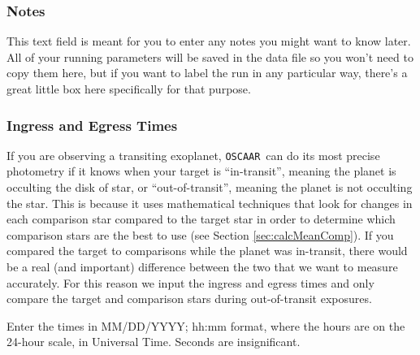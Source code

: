 \documentclass[a4paper]{article}
\newcommand{\code}[1]{\texttt{#1}}
\newcommand{\oscaar}{\code{OSCAAR}~}
\begin{document}
\subsubsection{Notes}
This text field is meant for you to enter any notes you might want to know later. All of your running parameters will be saved in the data file so you won't need to copy them here, but if you want to label the run in any particular way, there's a great little box here specifically for that purpose.

\subsubsection{Ingress and Egress Times} \label{sec:ingEgr}
If you are observing a transiting exoplanet, \oscaar can do its most precise photometry if it knows when your target is ``in-transit'', meaning the planet is occulting the disk of star, or ``out-of-transit'', meaning the planet is not occulting the star. This is because it uses mathematical techniques that look for changes in each comparison star compared to the target star in order to determine which comparison stars are the best to use (see Section \ref{sec:calcMeanComp}). If you compared the target to comparisons while the planet was in-transit, there would be a real (and important) difference between the two that we want to measure accurately. For this reason we input the ingress and egress times and only compare the target and comparison stars during out-of-transit exposures.

Enter the times in MM/DD/YYYY;  hh:mm format, where the hours are on the 24-hour scale, in Universal Time. Seconds are insignificant.
\end{document}
